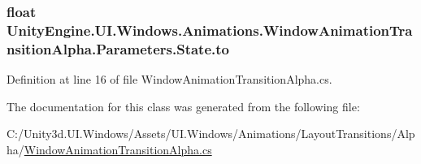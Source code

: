 \subsubsection[{to}]{\setlength{\rightskip}{0pt plus 5cm}float Unity\+Engine.\+U\+I.\+Windows.\+Animations.\+Window\+Animation\+Transition\+Alpha.\+Parameters.\+State.\+to}\label{class_unity_engine_1_1_u_i_1_1_windows_1_1_animations_1_1_window_animation_transition_alpha_1_1_parameters_1_1_state_a38d43a9dbbddb7028ef696000e900404}


Definition at line 16 of file Window\+Animation\+Transition\+Alpha.\+cs.



The documentation for this class was generated from the following file\+:\begin{DoxyCompactItemize}
\item 
C\+:/\+Unity3d.\+U\+I.\+Windows/\+Assets/\+U\+I.\+Windows/\+Animations/\+Layout\+Transitions/\+Alpha/\hyperlink{_window_animation_transition_alpha_8cs}{Window\+Animation\+Transition\+Alpha.\+cs}\end{DoxyCompactItemize}
